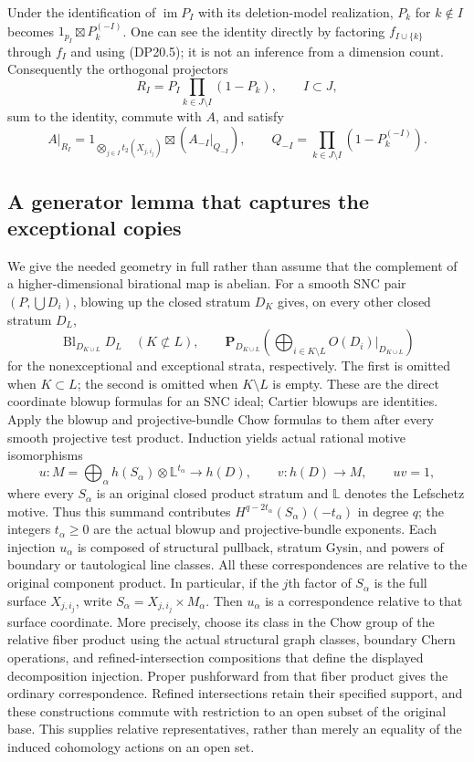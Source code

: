 Under the identification of $\operatorname{im}P_I$ with its
deletion-model realization, $P_k$ for $k\notin I$ becomes
$1_{p_I}\boxtimes P_k^{(-I)}$. One can see the identity directly
by factoring $f_{I\cup\{k\}}$ through $f_I$ and using
(DP20.5); it is not an inference from a dimension count.
Consequently the orthogonal projectors
\[
 R_I=P_I\prod_{k\in J\setminus I}(1-P_k),\qquad I\subset J,
 \tag{DP20.9}
\]
sum to the identity, commute with $A$, and satisfy
\[
 A|_{R_I}=1_{\bigotimes_{j\in I}t_2(X_{j,i_j})}
                 \boxtimes(A_{-I}|_{Q_{-I}}),
 \qquad Q_{-I}=\prod_{k\in J\setminus I}(1-P_k^{(-I)}).
 \tag{DP20.10}
\]

\subsection{A generator lemma that captures the exceptional copies}

We give the needed geometry in full rather than assume that the
complement of a higher-dimensional birational map is abelian.
For a smooth SNC pair $(P,\bigcup D_i)$, blowing up the closed
stratum $D_K$ gives, on every other closed stratum $D_L$,
\[
 \operatorname{Bl}_{D_{K\cup L}}D_L
 \quad(K\not\subset L),
 \qquad
 \mathbf P_{D_{K\cup L}}
      \left(\bigoplus_{i\in K\setminus L}O(D_i)|_{D_{K\cup L}}\right)
 \tag{DP20.11}
\]
for the nonexceptional and exceptional strata, respectively.
The first is omitted when $K\subset L$; the second is omitted
when $K\setminus L$ is empty. These are the direct coordinate
blowup formulas for an SNC ideal; Cartier blowups are identities.
Apply the blowup and projective-bundle Chow formulas to them
after every smooth projective test product. Induction yields
actual rational motive isomorphisms
\[
 u:M=\bigoplus_\alpha h(S_\alpha)\otimes\mathbb L^{t_\alpha}
            \longrightarrow h(D),
 \qquad v:h(D)\longrightarrow M,\qquad uv=1,
 \tag{DP20.12}
\]
where every $S_\alpha$ is an original closed product stratum and
$\mathbb L$ denotes the Lefschetz motive. Thus this summand
contributes $H^{q-2t_\alpha}(S_\alpha)(-t_\alpha)$ in degree
$q$; the integers $t_\alpha\geq0$ are the actual blowup and
projective-bundle exponents.
Each injection $u_\alpha$ is composed of structural pullback,
stratum Gysin, and powers of boundary or tautological line classes.
All these correspondences are relative to the original component
product. In particular, if the $j$th factor of $S_\alpha$ is
the full surface $X_{j,i_j}$, write
$S_\alpha=X_{j,i_j}\times M_\alpha$. Then $u_\alpha$ is a
correspondence relative to that surface coordinate.
More precisely, choose its class in the Chow group of the
relative fiber product using the actual structural graph classes,
boundary Chern operations, and refined-intersection compositions
that define the displayed decomposition injection. Proper
pushforward from that fiber product gives the ordinary
correspondence. Refined intersections retain their specified
support, and these constructions commute with restriction to
an open subset of the original base. This supplies relative
representatives, rather than merely an equality of the induced
cohomology actions on an open set.

